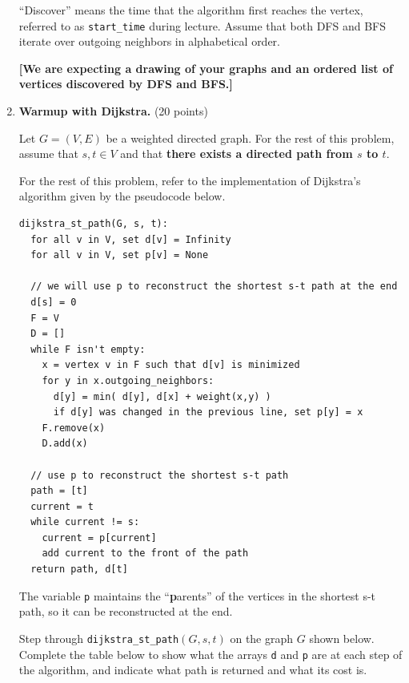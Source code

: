 \documentclass[12pt]{article}
\begin{document}
\begin{enumerate}
``Discover'' means the time that the algorithm first reaches the vertex, referred to as \verb|start_time| during lecture. Assume that both DFS and BFS iterate over outgoing neighbors in alphabetical order.

  \textbf{[We are expecting a drawing of your graphs and an ordered list of vertices discovered by DFS and BFS.]}

  \item \textbf{Warmup with Dijkstra.} (20 points)

  Let $G = (V,E)$ be a weighted directed graph.  For the rest of this problem, assume that $s, t \in V$ and that \textbf{there exists a directed path from $s$ to $t$}.

For the rest of this problem, refer to the implementation of Dijkstra's algorithm given by the pseudocode below.

\newpage

\begin{verbatim}
dijkstra_st_path(G, s, t):
  for all v in V, set d[v] = Infinity
  for all v in V, set p[v] = None 
  
  // we will use p to reconstruct the shortest s-t path at the end
  d[s] = 0
  F = V
  D = []
  while F isn't empty:
    x = vertex v in F such that d[v] is minimized
    for y in x.outgoing_neighbors:
      d[y] = min( d[y], d[x] + weight(x,y) )
      if d[y] was changed in the previous line, set p[y] = x
    F.remove(x)
    D.add(x)
        
  // use p to reconstruct the shortest s-t path
  path = [t]
  current = t
  while current != s:
    current = p[current]
    add current to the front of the path
  return path, d[t]
\end{verbatim}

The variable \verb|p| maintains the ``\textbf{p}arents'' of the vertices in the shortest s-t path, so it can be reconstructed at the end.

Step through \texttt{dijkstra\_st\_path}$(G,s,t)$ on the graph $G$ shown below. Complete the table below to show what the arrays \texttt{d} and \texttt{p} are at each step of the algorithm, and indicate what path is returned and what its cost is.


\end{enumerate}
\end{document}
